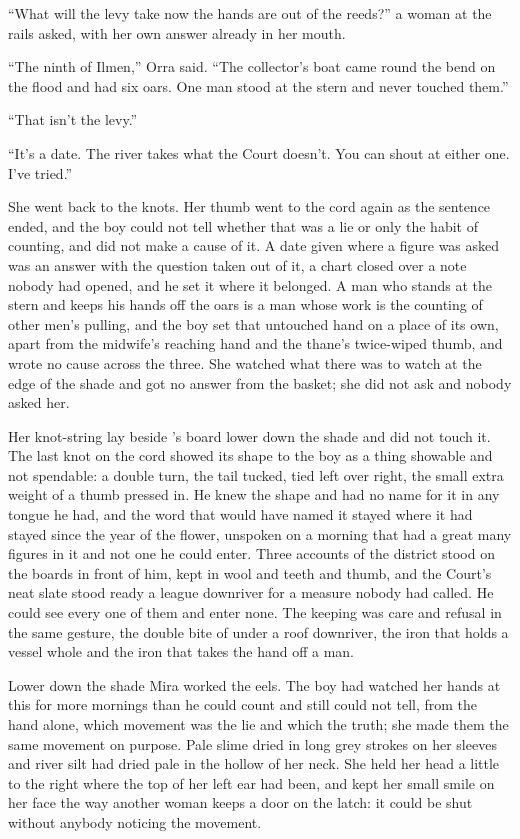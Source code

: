 “What will the levy take now the hands are out of the reeds?” a woman at the rails asked, with her own answer already in her mouth.

“The ninth of Ilmen,” Orra said. “The collector's boat came round the bend on the flood and had six oars. One man stood at the stern and never touched them.”

“That isn't the levy.”

“It's a date. The river takes what the Court doesn't. You can shout at either one. I've tried.”

She went back to the knots. Her thumb went to the cord again as the sentence ended, and the boy could not tell whether that was a lie or only the habit of counting, and did not make a cause of it. A date given where a figure was asked was an answer with the question taken out of it, a chart closed over a note nobody had opened, and he set it where it belonged. A man who stands at the stern and keeps his hands off the oars is a man whose work is the counting of other men's pulling, and the boy set that untouched hand on a place of its own, apart from the midwife's reaching hand and the thane's twice-wiped thumb, and wrote no cause across the three. She watched what there was to watch at the edge of the shade and got no answer from the basket; she did not ask and nobody asked her.

Her knot-string lay beside 's board lower down the shade and did not touch it. The last knot on the cord showed its shape to the boy as a thing showable and not spendable: a double turn, the tail tucked, tied left over right, the small extra weight of a thumb pressed in. He knew the shape and had no name for it in any tongue he had, and the word that would have named it stayed where it had stayed since the year of the flower, unspoken on a morning that had a great many figures in it and not one he could enter. Three accounts of the district stood on the boards in front of him, kept in wool and teeth and thumb, and the Court's neat slate stood ready a league downriver for a measure nobody had called. He could see every one of them and enter none. The keeping was care and refusal in the same gesture, the double bite of  under a roof downriver, the iron that holds a vessel whole and the iron that takes the hand off a man.

\scenebreak

Lower down the shade Mira worked the eels. The boy had watched her hands at this for more mornings than he could count and still could not tell, from the hand alone, which movement was the lie and which the truth; she made them the same movement on purpose. Pale slime dried in long grey strokes on her sleeves and river silt had dried pale in the hollow of her neck. She held her head a little to the right where the top of her left ear had been, and kept her small smile on her face the way another woman keeps a door on the latch: it could be shut without anybody noticing the movement.

